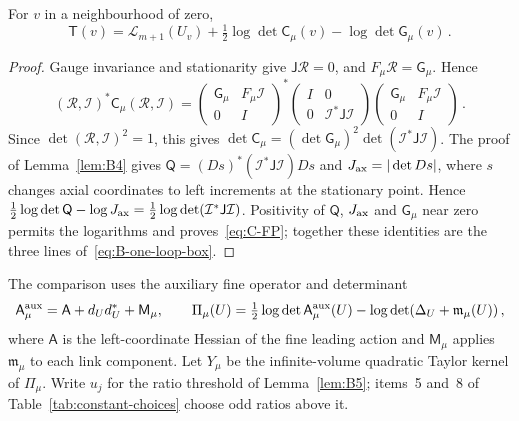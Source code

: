 \begin{lemma}\label{lem:C5}
For $v$ in a neighbourhood of zero,
\begin{equation}\label{eq:C-FP}
\mathsf T(v)=\mathcal L_{m+1}(U_v)+\tfrac12\log\det\mathsf C_\mu(v)-\log\det\mathsf G_\mu(v)\,.
\end{equation}
\end{lemma}

\begin{proof}
Gauge invariance and stationarity give $\mathsf J\mathcal R=0$, and $F_\mu\mathcal R=\mathsf G_\mu$. Hence
\begin{equation*}
(\mathcal R,\mathcal I)^*\mathsf C_\mu(\mathcal R,\mathcal I)=
\begin{pmatrix}\mathsf G_\mu&F_\mu\mathcal I\\0&I\end{pmatrix}^{\!*}
\begin{pmatrix}I&0\\0&\mathcal I^*\mathsf J\mathcal I\end{pmatrix}
\begin{pmatrix}\mathsf G_\mu&F_\mu\mathcal I\\0&I\end{pmatrix}\,.
\end{equation*}
Since $\det(\mathcal R,\mathcal I)^2=1$, this gives $\det\mathsf C_\mu=(\det\mathsf G_\mu)^2\det(\mathcal I^*\mathsf J\mathcal I)$. The proof of Lemma~\ref{lem:B4} gives $\mathsf Q=(Ds)^*(\mathcal I^*\mathsf J\mathcal I)Ds$ and $J_{\rm ax}=|\det Ds|$, where $s$ changes axial coordinates to left increments at the stationary point. Hence $\frac12\log\det\mathsf Q-\log J_{\rm ax}=\frac12\log\det(\mathcal I^*\mathsf J\mathcal I)$. Positivity of $\mathsf Q$, $J_{\rm ax}$ and $\mathsf G_\mu$ near zero permits the logarithms and proves~\eqref{eq:C-FP}; together these identities are the three lines of~\eqref{eq:B-one-loop-box}.
\end{proof}

The comparison uses the auxiliary fine operator and determinant
\begin{equation*}
\mathsf A^{\rm aux}_\mu=\mathsf A+d_Ud_U^*+\mathsf M_\mu,\qquad
\Pi_\mu(U)=\tfrac12\log\det\mathsf A^{\rm aux}_\mu(U)
-\log\det(\Delta_U+\mathfrak m_\mu(U))\,,
\end{equation*}
where $\mathsf A$ is the left-coordinate Hessian of the fine leading action and $\mathsf M_\mu$ applies $\mathfrak m_\mu$ to each link component. Let $Y_\mu$ be the infinite-volume quadratic Taylor kernel of $\Pi_\mu$. Write $u_j$ for the ratio threshold of Lemma~\ref{lem:B5}; items~5 and~8 of Table~\ref{tab:constant-choices} choose odd ratios above it.

